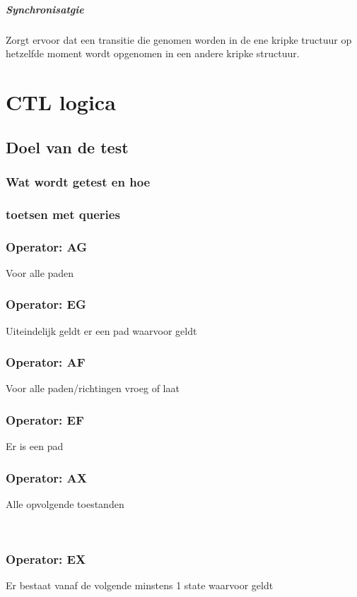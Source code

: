 \paragraph{Synchronisatgie}
Zorgt ervoor dat  een transitie die genomen worden in de ene kripke tructuur op hetzelfde moment wordt opgenomen in een andere kripke structuur.
\chapter{CTL logica}


\section{Doel van de test}
\subsection{Wat wordt getest en hoe}


\subsection{toetsen met queries}





\subsection{Operator: AG}
Voor alle paden


\subsection{Operator: EG}
Uiteindelijk geldt er een pad waarvoor geldt

\subsection{Operator: AF}
Voor alle paden/richtingen vroeg of laat
\subsection{Operator: EF}
Er is een pad
\subsection{Operator: AX}
Alle opvolgende toestanden

~\cite{locke_2020}
\subsection{Operator: EX}
Er bestaat vanaf de volgende minstens 1 state waarvoor geldt
